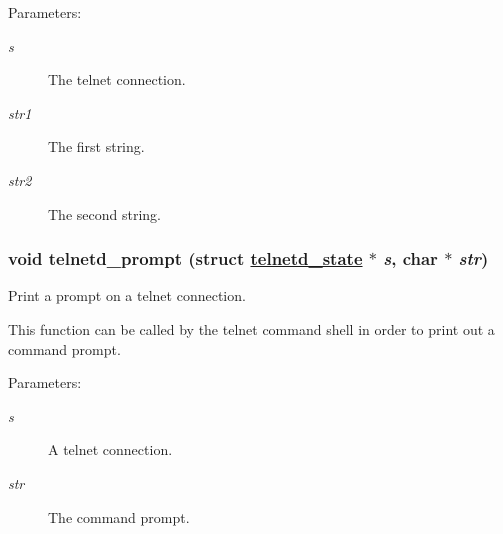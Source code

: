\begin{Desc}
\item[Parameters:]
\begin{description}
\item[{\em s}]The telnet connection.\item[{\em str1}]The first string.\item[{\em str2}]The second string. \end{description}
\end{Desc}
\hypertarget{a00081_g8873fd3ee516cfcca82cc4bc67f564c0}{
\subsubsection[telnetd\_\-prompt]{\setlength{\rightskip}{0pt plus 5cm}void telnetd\_\-prompt (struct \hyperlink{a00027}{telnetd\_\-state} $\ast$ {\em s}, char $\ast$ {\em str})}}
\label{a00081_g8873fd3ee516cfcca82cc4bc67f564c0}


Print a prompt on a telnet connection. 

This function can be called by the telnet command shell in order to print out a command prompt.

\begin{Desc}
\item[Parameters:]
\begin{description}
\item[{\em s}]A telnet connection.\item[{\em str}]The command prompt. \end{description}
\end{Desc}
